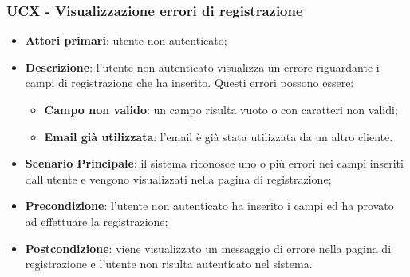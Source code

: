 \subsubsection{UCX - Visualizzazione errori di registrazione}
\begin{itemize}
\item \textbf{Attori primari}: utente non autenticato;
\item \textbf{Descrizione}: l'utente non autenticato visualizza un errore riguardante i campi di registrazione che ha inserito. Questi errori possono essere:
\begin{itemize}
\item \textbf{Campo non valido}: un campo risulta vuoto o con caratteri non validi;
\item \textbf{Email già utilizzata}: l'email è già stata utilizzata da un altro cliente.
\end{itemize}
\item \textbf{Scenario Principale}: il sistema riconosce uno o più errori nei campi inseriti dall'utente e vengono visualizzati nella pagina di registrazione;
\item \textbf{Precondizione}: l'utente non autenticato ha inserito i campi ed ha provato ad effettuare la registrazione;
\item \textbf{Postcondizione}: viene visualizzato un messaggio di errore nella pagina di registrazione e l'utente non risulta autenticato nel sistema.
\end{itemize}

